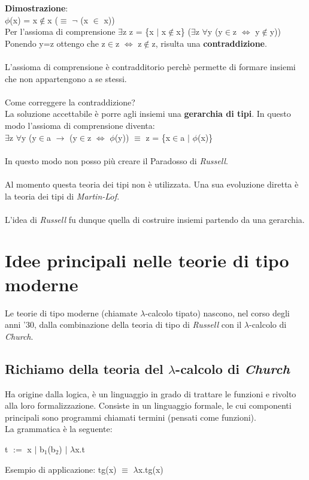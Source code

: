 \noindent \textbf{Dimostrazione}:\\
$\phi$(x) = x$\notin$x ($\equiv$ $\neg$ (x $\in$ x))\\
Per l'assioma di comprensione	$\exists$z z = \{x $|$ x$\notin$x\} ($\exists$z $\forall$y (y$\in$z $\Leftrightarrow$ y$\notin$y))\\
Ponendo y=z ottengo che z$\in$z $\Leftrightarrow$ z$\notin$z, risulta una \textbf{contraddizione}.\\\\
L'assioma di comprensione \`e contradditorio perch\`e permette di formare insiemi che non appartengono a se stessi.\\\\
Come correggere la contraddizione?\\
La soluzione accettabile \`e porre agli insiemi una \textbf{gerarchia di tipi}. In questo modo l'assioma di comprensione diventa:\\
$\exists$z $\forall$y (y$\in$a $\to$ (y$\in$z $\Leftrightarrow$ $\phi$(y)) $\equiv$ z = \{x$\in$a $\big|$ $\phi$(x)\}\\\\
In questo modo non posso pi\`u creare il Paradosso di \textit{Russell}.\\\\
Al momento questa teoria dei tipi non \`e utilizzata. Una sua evoluzione diretta \`e 
la teoria dei tipi di \textit{Martin-L$\ddot{o}$f}.\\\\
L'idea di \textit{Russell} fu dunque quella di costruire insiemi partendo da una gerarchia.

\section{Idee principali nelle teorie di tipo moderne}
\label{sec:idee-teorie-moderne}
Le teorie di tipo moderne (chiamate $\lambda$-calcolo tipato) nascono, nel corso degli anni '30, dalla combinazione della teoria di tipo di \textit{Russell} con il $\lambda$-calcolo di \textit{Church}.

\subsection{Richiamo della teoria del $\lambda$-calcolo di \textit{Church}}
\label{subsec:lambda-calcolo}
Ha origine dalla logica, \`e un linguaggio in grado di trattare le funzioni e rivolto alla loro formalizzazione. Consiste in un linguaggio formale, le cui componenti principali sono programmi chiamati termini (pensati come funzioni).\\ La grammatica \`e la seguente:
\begin{center} t $:=$ x $|$ b$_1$(b$_2$) $|$ $\lambda$x.t \end{center}
Esempio di applicazione: tg(x) $\equiv$ $\lambda$x.tg(x)


